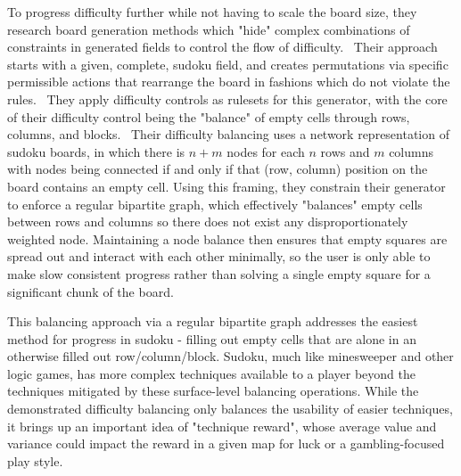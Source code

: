 To progress difficulty further while not having to scale the board size, they research board generation methods which "hide" complex combinations of constraints in generated fields to control the flow of difficulty.
\
Their approach starts with a given, complete, sudoku field, and creates permutations via specific permissible actions that rearrange the board in fashions which do not violate the rules.
\
They apply difficulty controls as rulesets for this generator,
with the core of their difficulty control being the "balance" of empty cells through rows, columns, and blocks.
\
Their difficulty balancing uses a network representation of sudoku boards, in which there is $n+m$ nodes for each $n$ rows and $m$ columns with nodes being connected if and only if that (row, column) position on the board contains an empty cell. Using this framing, they constrain their generator to enforce a regular bipartite graph, which effectively "balances" empty cells between rows and columns so there does not exist any disproportionately weighted node. Maintaining a node balance then ensures that empty squares are spread out and interact with each other minimally, so the user is only able to make slow consistent progress rather than solving a single empty square for a significant chunk of the board.

This balancing approach via a regular bipartite graph addresses the easiest method for progress in sudoku - filling out empty cells that are alone in an otherwise filled out row/column/block.
Sudoku, much like minesweeper and other logic games, has more complex techniques available to a player beyond the techniques mitigated by these surface-level balancing operations. While the demonstrated difficulty balancing only balances the usability of easier techniques, it brings up an important idea of "technique reward", whose average value and variance could impact the reward in a given map for luck or a gambling-focused play style.

